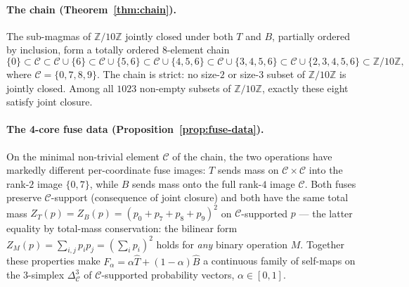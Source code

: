 \documentclass[11pt,reqno]{amsart}
\theoremstyle{plain}
\theoremstyle{definition}
\theoremstyle{remark}
\newcommand{\Z}{\mathbb{Z}}
\newcommand{\Zten}{\Z/10\Z}
\newcommand{\Cfour}{\mathcal{C}}
\newcommand{\Tfuse}{\widehat{T}}
\newcommand{\Bfuse}{\widehat{B}}
\begin{document}
\paragraph{The chain (Theorem~\ref{thm:chain}).} The sub-magmas of
$\Zten$ jointly closed under both $T$ and $B$, partially ordered
by inclusion, form a totally ordered $8$-element chain
\[
\{0\}\subset\Cfour\subset\Cfour\cup\{6\}\subset\Cfour\cup\{5,6\}\subset
\Cfour\cup\{4,5,6\}\subset\Cfour\cup\{3,4,5,6\}\subset
\Cfour\cup\{2,3,4,5,6\}\subset\Zten,
\]
where $\Cfour=\{0,7,8,9\}$. The chain is strict: no size-$2$ or
size-$3$ subset of $\Zten$ is jointly closed. Among all $1023$
non-empty subsets of $\Zten$, exactly these eight satisfy joint
closure.

\paragraph{The 4-core fuse data (Proposition~\ref{prop:fuse-data}).}
On the minimal non-trivial element $\Cfour$ of the chain, the two
operations have markedly different per-coordinate fuse images:
$T$ sends mass on $\Cfour\times\Cfour$ into the rank-$2$ image
$\{0, 7\}$, while $B$ sends mass onto the full rank-$4$ image
$\Cfour$. Both fuses preserve $\Cfour$-support (consequence of
joint closure) and both have the same total mass $Z_{T}(p) =
Z_{B}(p) = (p_{0}+p_{7}+p_{8}+p_{9})^{2}$ on $\Cfour$-supported
$p$ --- the latter equality by total-mass conservation: the
bilinear form $Z_{M}(p) = \sum_{i,j}p_{i}p_{j} =
(\sum_{i}p_{i})^{2}$ holds for \emph{any} binary operation $M$.
Together these properties make
$F_\alpha = \alpha\Tfuse + (1-\alpha)\Bfuse$ a continuous family
of self-maps on the $3$-simplex $\Delta^{3}_{\Cfour}$ of
$\Cfour$-supported probability vectors, $\alpha\in[0,1]$.
\end{document}
